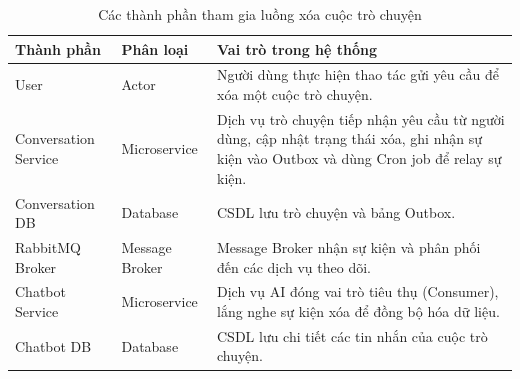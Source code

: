 \begin{table}[H]
\centering
\renewcommand{\arraystretch}{1.3}

\begin{tabular}{|l|l|p{5cm}|}
\hline
\textbf{Thành phần} & \textbf{Phân loại} & \textbf{Vai trò trong hệ thống} \\ \hline
User & Actor & Người dùng thực hiện thao tác gửi yêu cầu để xóa một cuộc trò chuyện. \\ \hline
Conversation Service & Microservice & Dịch vụ trò chuyện tiếp nhận yêu cầu từ người dùng, cập nhật trạng thái xóa, ghi nhận sự kiện vào Outbox và dùng Cron job để relay sự kiện. \\ \hline
Conversation DB & Database & CSDL lưu trò chuyện và bảng Outbox. \\ \hline
RabbitMQ Broker & Message Broker & Message Broker nhận sự kiện và phân phối đến các dịch vụ theo dõi. \\ \hline
Chatbot Service & Microservice & Dịch vụ AI đóng vai trò tiêu thụ (Consumer), lắng nghe sự kiện xóa để đồng bộ hóa dữ liệu. \\ \hline
Chatbot DB & Database & CSDL lưu chi tiết các tin nhắn của cuộc trò chuyện. \\ \hline
\end{tabular}
\caption{Các thành phần tham gia luồng xóa cuộc trò chuyện}
\end{table}
